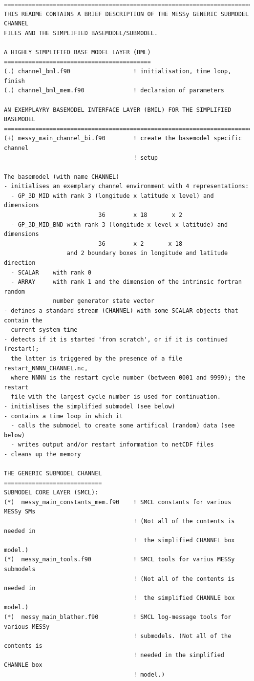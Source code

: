 \documentclass[twoside]{article}
\begin{document}
\begin{verbatim}
==============================================================================
THIS README CONTAINS A BRIEF DESCRIPTION OF THE MESSy GENERIC SUBMODEL CHANNEL
FILES AND THE SIMPLIFIED BASEMODEL/SUBMODEL.

A HIGHLY SIMPLIFIED BASE MODEL LAYER (BML)
==========================================
(.) channel_bml.f90                  ! initialisation, time loop, finish
(.) channel_bml_mem.f90              ! declaraion of parameters

AN EXEMPLAYRY BASEMODEL INTERFACE LAYER (BMIL) FOR THE SIMPLIFIED BASEMODEL
===========================================================================
(+) messy_main_channel_bi.f90        ! create the basemodel specific channel
                                     ! setup

The basemodel (with name CHANNEL)
- initialises an exemplary channel environment with 4 representations:
  - GP_3D_MID with rank 3 (longitude x latitude x level) and dimensions
                           36        x 18       x 2
  - GP_3D_MID_BND with rank 3 (longitude x level x latitude) and dimensions
                           36        x 2       x 18
                  and 2 boundary boxes in longitude and latitude direction
  - SCALAR    with rank 0
  - ARRAY     with rank 1 and the dimension of the intrinsic fortran random
              number generator state vector
- defines a standard stream (CHANNEL) with some SCALAR objects that contain the
  current system time
- detects if it is started 'from scratch', or if it is continued (restart);
  the latter is triggered by the presence of a file restart_NNNN_CHANNEL.nc,
  where NNNN is the restart cycle number (between 0001 and 9999); the restart
  file with the largest cycle number is used for continuation.
- initialises the simplified submodel (see below)
- contains a time loop in which it
  - calls the submodel to create some artifical (random) data (see below)
  - writes output and/or restart information to netCDF files
- cleans up the memory

THE GENERIC SUBMODEL CHANNEL
============================
SUBMODEL CORE LAYER (SMCL):
(*)  messy_main_constants_mem.f90    ! SMCL constants for various MESSy SMs
                                     ! (Not all of the contents is needed in
                                     !  the simplified CHANNEL box model.)
(*)  messy_main_tools.f90            ! SMCL tools for varius MESSy submodels
                                     ! (Not all of the contents is needed in
                                     !  the simplified CHANNLE box model.)
(*)  messy_main_blather.f90          ! SMCL log-message tools for various MESSy
                                     ! submodels. (Not all of the contents is
                                     ! needed in the simplified CHANNLE box
                                     ! model.)


\end{verbatim}
\end{document}
